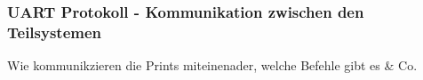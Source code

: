 \documentclass[main.tex]{subfiles} %
\begin{document}

\subsubsection{UART Protokoll - Kommunikation zwischen den Teilsystemen}

Wie kommunikzieren die Prints miteinenader, welche Befehle gibt es \& Co.
\end{document}
